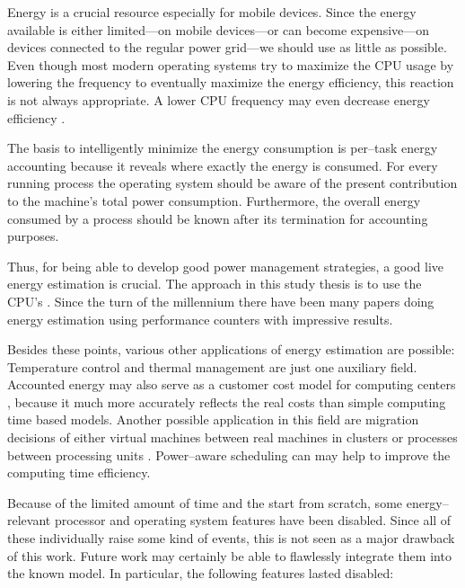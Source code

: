 
Energy is a crucial resource especially for mobile devices. Since the energy
available is either limited---on mobile devices---or can become expensive---on
devices connected to the regular power grid---we should use as little as
possible. Even though most modern operating systems try to maximize the CPU
usage by lowering the frequency \cite{snowdon2010operating} to eventually
maximize the energy efficiency, this reaction is not always appropriate. A
lower CPU frequency may even decrease energy efficiency
\cite{weissel2002process,snowdon2010operating}.

The basis to intelligently minimize the energy consumption is per--task energy
accounting because it reveals where exactly the energy is consumed. For every
running process the operating system should be aware of the present contribution
to the machine's total power consumption. Furthermore, the overall energy
consumed by a process should be known after its termination for accounting
purposes.

Thus, for being able to develop good power management strategies, a good live
energy estimation is crucial. The approach in this study thesis is to use the
CPU's . Since the turn of the millennium
\cite{bellosa2000benefits} there have been many papers
\cite{Bertran2010,bertran2010decomposable,kellner03tempcontrol,isci2003runtime,
weissel2002process} doing energy estimation using performance counters with
impressive results.

Besides these points, various other applications of energy estimation are
possible: Temperature control \cite{kellner03tempcontrol} and thermal management
\cite{merkel05tmsmpsys} are just one auxiliary field. Accounted energy may also
serve as a customer cost model for computing centers \cite{Bertran2010}, because
it much more accurately reflects the real costs than simple computing time based
models. Another possible application in this field are migration decisions of
either virtual machines between real machines in clusters or processes between
processing units \cite{merkel10rcscheduling}. Power--aware scheduling can may
help to improve the computing time efficiency.


\label{sec:restrictions}

Because of the limited amount of time and the start from scratch, some
energy--relevant processor and operating system features have been disabled.
Since all of these individually raise some kind of events, this is not seen as a
major drawback of this work.  Future work may certainly be able to flawlessly
integrate them into the known model. In particular, the following features
lasted disabled:

